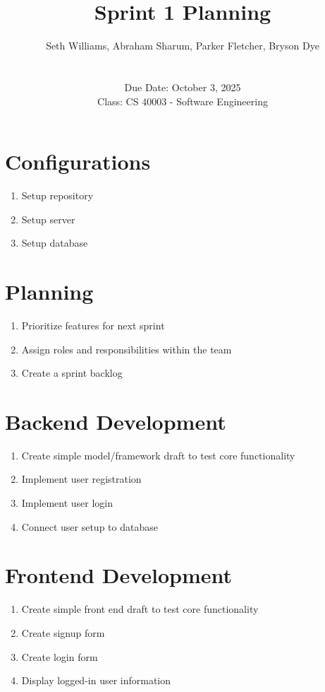 \documentclass[10pt,titlepage]{article}
\title{Sprint 1 Planning}
\author{Seth Williams, Abraham Sharum, Parker Fletcher, Bryson Dye \\\\ \\ Due Date: October 3, 2025 \\ Class: CS 40003 - Software Engineering}
\begin{document}
	\pagestyle{fancy}
	\fancyhead{}
	\fancyfoot{}
	\fancyfoot[CE,CO]{\textbf{\thepage}}
	
	
	\maketitle
	
	\section*{Configurations}
	\begin{enumerate}
		\item Setup repository
		\item Setup server
		\item Setup database
	\end{enumerate}
	
	\section*{Planning}
	\begin{enumerate}
		\item Prioritize features for next sprint 
		\item Assign roles and responsibilities within the team
		\item Create a sprint backlog
	\end{enumerate}
	
	\section*{Backend Development}
	\begin{enumerate}
		\item Create simple model/framework draft to test core functionality 
		\item Implement user registration
		\item Implement user login
		\item Connect user setup to database
	\end{enumerate}
	
	\section*{Frontend Development}
	\begin{enumerate}
		\item Create simple front end draft to test core functionality
		\item Create signup form
		\item Create login form
		\item Display logged-in user information
	\end{enumerate}
	
\end{document}
